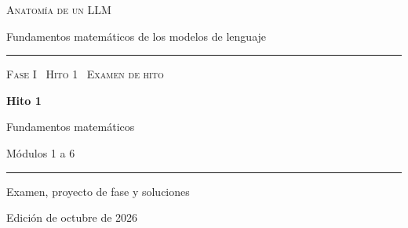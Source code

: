 \documentclass[11pt,a4paper,twoside,openany]{book}
\begin{document}
\frontmatter
\begin{titlepage}
\centering
\vspace*{2.5cm}
{\large\scshape Anatomía de un LLM}\par
\vspace{0.4cm}
{\normalsize Fundamentos matemáticos de los modelos de lenguaje}\par
\vspace{2.2cm}
\rule{\textwidth}{0.8pt}\par\vspace{0.5cm}
{\small\scshape Fase I \textperiodcentered\ Hito 1 \textperiodcentered\ Examen de hito}\par\vspace{0.3cm}
{\Huge\bfseries Hito 1\par}\vspace{0.3cm}
{\LARGE Fundamentos matemáticos\par}
\vspace{0.3cm}
{\large Módulos 1 a 6\par}
\vspace{0.5cm}\rule{\textwidth}{0.4pt}\par
\vspace{1.6cm}
{\large Examen, proyecto de fase y soluciones}\par
\vfill
{\small Edición de octubre de 2026}\par
\end{titlepage}



\tableofcontents

\mainmatter




\appendix



\backmatter

\end{document}
